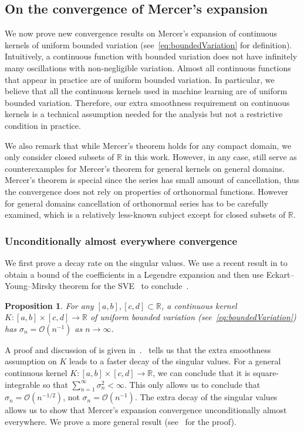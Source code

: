 \documentclass{article}
\newtheorem{proposition}{Proposition}
\begin{document}
\subsection{On the convergence of Mercer's expansion}\label{sec:mainresult}
We now prove new convergence results on Mercer's expansion of continuous kernels of uniform bounded variation (see~\cref{eq:boundedVariation} for definition). Intuitively, a continuous function with bounded variation does not have infinitely many oscillations with non-negligible variation. Almost all continuous functions that appear in practice are of uniform bounded variation. In particular, we believe that all the continuous kernels used in machine learning are of uniform bounded variation. Therefore, our extra smoothness requirement on continuous kernels is a technical assumption needed for the analysis but not a restrictive condition in practice. 

We also remark that while Mercer's theorem holds for any compact domain, we only consider closed subsets of $\mathbb{R}$ in this work. However, in any case,  still serve as counterexamples for Mercer's theorem for general kernels on general domains. Mercer's theorem is special since the series has small amount of cancellation, thus the convergence does not rely on properties of orthonormal functions. However for general domains cancellation of orthonormal series has to be carefully examined, which is a relatively less-known subject except for closed subsets of $\mathbb{R}$. 

\subsubsection{Unconditionally almost everywhere convergence}
\par We first prove a decay rate on the singular values. We use a recent result in \citep{Wang2023} to obtain a bound of the coefficients in a Legendre expansion and then use Eckart--Young--Mirsky theorem for the SVE~\citep{schmidt1907theorie,eckart1936approximation,mirsky1960symmetric} to conclude~.
\begin{proposition}\label{prop:singularvaluebound}
For any $[a, b], [c, d]\subset\mathbb{R}$, a continuous kernel $K:[a,b]\times [c,d]\rightarrow\mathbb{R}$ of uniform bounded variation (see~\cref{eq:boundedVariation}) has $\sigma_n = \mathcal{O}(n^{-1})$ as $n\rightarrow\infty$. 
\end{proposition}
A proof and discussion of  is given in~.~ tells us that the extra smoothness assumption on $K$ leads to a faster decay of the singular values. For a general continuous kernel $K:[a,b]\times [c,d]\rightarrow\mathbb{R}$, we can conclude that it is square-integrable so that 
$\sum_{n=1}^\infty \sigma_n^2 <\infty$.
This only allows us to conclude that $\sigma_n=\mathcal{O}(n^{-1/2})$, not $\sigma_n = \mathcal{O}(n^{-1})$. The extra decay of the singular values allows us to show that Mercer's expansion convergence unconditionally almost everywhere. We prove a more general result (see~ for the proof). 
\end{document}

